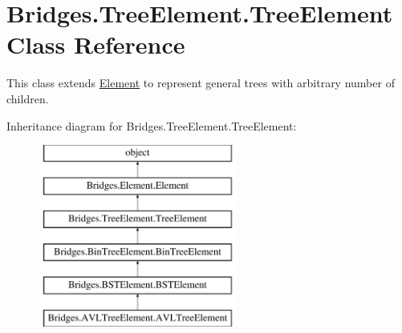 \hypertarget{class_bridges_1_1_tree_element_1_1_tree_element}{}\section{Bridges.\+Tree\+Element.\+Tree\+Element Class Reference}
\label{class_bridges_1_1_tree_element_1_1_tree_element}


This class extends \hyperlink{namespace_bridges_1_1_element}{Element} to represent general trees with arbitrary number of children.  


Inheritance diagram for Bridges.\+Tree\+Element.\+Tree\+Element\+:\begin{figure}[H]
\begin{center}
\leavevmode
\includegraphics[height=6.000000cm]{class_bridges_1_1_tree_element_1_1_tree_element}
\end{center}
\end{figure}
